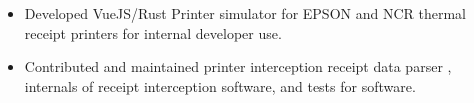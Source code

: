 \documentclass[10pt,letter,ragged2e]{altacv}
\begin{document}
\begin{paracol}{2}
\begin{itemize}
\item Developed VueJS/Rust Printer simulator for EPSON and NCR thermal receipt printers for internal developer use.
\item Contributed and maintained printer interception receipt data parser , internals of receipt interception software, and tests for software.

\end{itemize}
\end{paracol}
\end{document}
